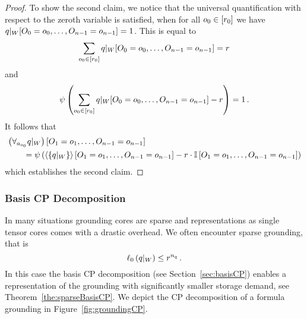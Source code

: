 \begin{proof}
	To show the second claim, we notice that the universal quantification with respect to the zeroth variable is satisfied, when for all $o_{0}\in[r_{0}]$ we have ${q}|_{W}[O_{0}=o_{0},\ldots,O_{n-1}=o_{n-1}]=1$.
	This is equal to 
	\begin{align*}
		 \sum_{o_{0}\in[r_{0}]} {q}|_{W}[O_{0}=o_{0},\ldots,O_{n-1}=o_{n-1}]  = r
	\end{align*}
	and 
	\begin{align*}
		\psi\left(\sum_{o_{0}\in[r_{0}]} {q}|_{W}[O_{0}=o_{0},\ldots,O_{n-1}=o_{n-1}] - r\right) = 1 \, . 
	\end{align*} 
	It follows that
	\begin{align*}
		& \left({\forall_{a_{o_{0}}} q}|_{W}\right)[O_{1}=o_{1},\ldots,O_{n-1}=o_{n-1}] \\
			& \quad \quad =  \psi\left(
			\left\langle \left\{{q}|_{W}\right\}\right\rangle \left[ O_{1}=o_{1},\ldots,O_{n-1}=o_{n-1} \right]
			- r \cdot \mathbb{I}\left[O_{1}=o_{1},\ldots,O_{n-1}=o_{n-1}\right]
			\right)
	\end{align*}
	which establishes the second claim.
\end{proof}




\subsubsection{Basis CP Decomposition}\label{sec:basisCPgrounding}

In many situations grounding cores are sparse and representations as single tensor cores comes with a drastic overhead.
We often encounter sparse grounding, that is
	\[ \ell_0\left({q}|_{W}\right) \leq r^{n_q} \, . \]
In this case the basis CP decomposition (see Section~\ref{sec:basisCP}) enables a representation of the grounding with significantly smaller storage demand, see Theorem~\ref{the:sparseBasisCP}.
We depict the CP decomposition of a formula grounding in Figure~\ref{fig:groundingCP}.


